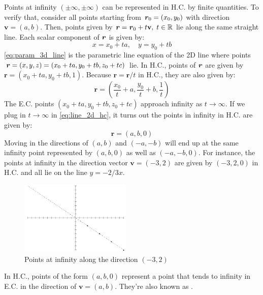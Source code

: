 \documentclass[a4paper]{article}
\begin{document}
Points at infinity $(\pm \infty, \pm \infty)$ can be represented in H.C. by finite quantities. To verify that, consider all points starting from $\textbf{\textit{r}}_0 = (x_0,y_0)$ with direction $\textbf{v} = (a,b)$. Then, points given by $\textbf{\textit{r}} = \textbf{\textit{r}}_0 + t\textbf{v},\; t\in\mathbb{R}$ lie along the same straight line. Each scalar component of $\textbf{\textit{r}}$ is given by:
\begin{equation*}
    x = x_0 + ta, \quad y = y_0 + tb \tag{1}
    \label{eq:param_3d_line}
\end{equation*}
\eqref{eq:param_3d_line} is the parametric line equation of the 2D line where points $\textbf{\textit{r}} = (x,y,z) = (x_0 + ta, y_0 + tb, z_0 + tc)$ lie. In H.C., points of $\textbf{\textit{r}}$ are given by $\textbf{r} = (x_0 + ta, y_0 + tb, 1)$. Because $\textbf{r} = \textbf{r}/t$ in H.C., they are also given by:
\[
\textbf{r} = (\frac{x_0}{t} + a, \frac{y_0}{t} + b, \frac{1}{t}) 
\label{eq:line_2d_hc}
\tag{2}
\]
The E.C. points $(x_0 + ta, y_0 + tb, z_0 + tc)$ approach infinity as $t\rightarrow \infty$. If we plug in $t\rightarrow \infty$ in \eqref{eq:line_2d_hc}, it turns out the points in infinity in H.C. are given by:
\[
\textbf{r} = (a, b , 0) 
\]
 Moving in the directions of $(a,b)$ and $(-a, -b)$ will end up at the same infinity point represented by $(a,b,0)$ as well as $(-a, -b, 0)$. For instance, the points at infinity in the direction vector $\textbf{v}=(-3,2)$ are given by $(-3,2,0)$ in H.C. and all lie on the line $y=-2/3x$.
 \begin{figure}[H]
     \centering
     \includegraphics[height=3.5cm]{img/points_inf_graph.png}
     \caption{Points at infinity along the direction $(-3,2)$}
 \end{figure}
\begin{corollary}
In H.C., points of the form $(a, b, 0)$ represent a point that tends to infinity in E.C. in the direction of $\textbf{v} = (a,b)$. They're also known as .
\end{corollary}
\end{document}
